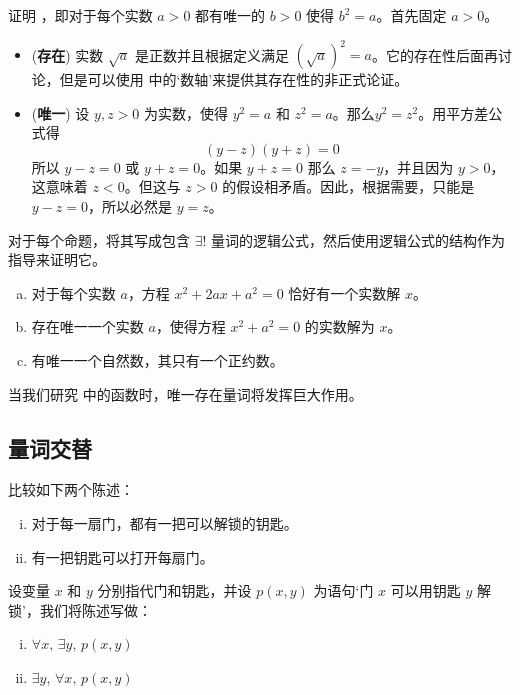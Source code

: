 \begin{example}
\label{exEveryPositiveRealHasUniqueSquareRootProof}
证明 ，即对于每个实数 $a>0$ 都有唯一的 $b>0$ 使得 $b^2=a$。首先固定 $a > 0$。
\begin{itemize}
\item (\textbf{存在}) 实数 $\sqrt{a}$ 是正数并且根据定义满足 $(\sqrt{a})^2=a$。它的存在性后面再讨论，但是可以使用  中的`数轴'来提供其存在性的非正式论证。
\item (\textbf{唯一}) 设 $y,z > 0$ 为实数，使得 $y^2=a$ 和 $z^2=a$。那么$y^2=z^2$。用平方差公式得
\[(y-z)(y+z)=0\]
所以 $y-z=0$ 或 $y+z=0$。如果 $y+z=0$ 那么 $z=-y$，并且因为 $y>0$，这意味着 $z<0$。但这与 $z>0$ 的假设相矛盾。因此，根据需要，只能是 $y-z=0$，所以必然是 $y=z$。
\end{itemize}
\end{example}

\begin{exercise}
\label{exExamplesOfUniqueExistentialQuantifier}
对于每个命题，将其写成包含 $\exists !$ 量词的逻辑公式，然后使用逻辑公式的结构作为指导来证明它。
\begin{enumerate}[(a)]
\item 对于每个实数 $a$，方程 $x^2+2ax+a^2=0$ 恰好有一个实数解 $x$。
\item 存在唯一一个实数 $a$，使得方程 $x^2+a^2=0$ 的实数解为 $x$。
\item 有唯一一个自然数，其只有一个正约数。
\end{enumerate}
\end{exercise}

当我们研究  中的函数时，唯一存在量词将发挥巨大作用。

\subsection*{量词交替}
比较如下两个陈述：
\begin{enumerate}[(i)] 
\item 对于每一扇门，都有一把可以解锁的钥匙。
\item 有一把钥匙可以打开每扇门。
\end{enumerate}

设变量 $x$ 和 $y$ 分别指代门和钥匙，并设 $p(x,y)$ 为语句`门 $x$ 可以用钥匙 $y$ 解锁'，我们将陈述写做：
\begin{enumerate}[(i)] 
\item $\forall x,\, \exists y,\, p(x,y)$
\item $\exists y,\, \forall x,\, p(x,y)$
\end{enumerate}

